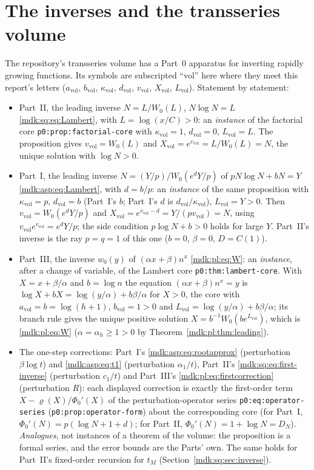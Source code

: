 \documentclass[11pt,letterpaper]{article}
\numberwithin{equation}{section}
\theoremstyle{remark}\newtheorem{remark}[theorem]{Remark}
\newcommand{\file}[1]{\nolinkurl{#1}}
\newcommand{\vol}{\mathrm{vol}}
\begin{document}
\section*{The inverses and the transseries volume}\label{mdk:sec:inverses}
The repository's transseries volume \cite{TSvol} has a Part~0 apparatus for inverting rapidly growing functions. Its symbols are subscripted ``vol'' here where they meet this report's letters ($a_\vol$, $b_\vol$, $\kappa_\vol$, $d_\vol$, $v_\vol$, $X_\vol$, $L_\vol$). Statement by statement:
\begin{itemize}
\item Part~II, the leading inverse $N=L/W_0(L)$, $N\log N=L$ \eqref{mdk:sq:eq:Lambert}, with $L=\log(x/C)>0$: an \emph{instance} of the factorial core \file{p0:prop:factorial-core} with $\kappa_\vol=1$, $d_\vol=0$, $L_\vol=L$. The proposition gives $v_\vol=W_0(L)$ and $X_\vol=e^{v_\vol}=L/W_0(L)=N$, the unique solution with $\log N>0$.
\item Part~I, the leading inverse $N=(Y/p)/W_0(e^dY/p)$ of $pN\log N+bN=Y$ \eqref{mdk:asp:eq:Lambert}, with $d=b/p$: an \emph{instance} of the same proposition with $\kappa_\vol=p$, $d_\vol=b$ (Part~I's $b$; Part~I's $d$ is $d_\vol/\kappa_\vol$), $L_\vol=Y>0$. Then $v_\vol=W_0(e^dY/p)$ and $X_\vol=e^{v_\vol-d}=Y/(pv_\vol)=N$, using $v_\vol e^{v_\vol}=e^dY/p$; the side condition $p\log N+b>0$ holds for large $Y$. Part~II's inverse is the ray $p=q=1$ of this one ($b=0$, $\beta=0$, $D=C(1)$).
\item Part~III, the inverse $w_0(y)$ of $(\alpha x+\beta)n^x$ \eqref{mdk:pl:eq:W}: an \emph{instance}, after a change of variable, of the Lambert core \file{p0:thm:lambert-core}. With $X=x+\beta/\alpha$ and $b=\log n$ the equation $(\alpha x+\beta)n^x=y$ is $\log X+bX=\log(y/\alpha)+b\beta/\alpha$ for $X>0$, the core with $a_\vol=b=\log(h+1)$, $b_\vol=1>0$ and $L_\vol=\log(y/\alpha)+b\beta/\alpha$; its branch rule gives the unique positive solution $X=b^{-1}W_0(be^{L_\vol})$, which is \eqref{mdk:pl:eq:W} ($\alpha=\alpha_h\ge1>0$ by Theorem~\ref{mdk:pl:thm:leading}).
\item The one-step corrections: Part~I's \eqref{mdk:asp:eq:rootapprox} (perturbation $\beta\log t$) and \eqref{mdk:asp:eq:t1} (perturbation $\alpha_1/t$), Part~II's \eqref{mdk:sq:eq:first-inverse} (perturbation $c_1/t$) and Part~III's \eqref{mdk:pl:eq:firstcorrection} (perturbation $R$): each displayed correction is exactly the first-order term $X-\varrho(X)/\Phi_0'(X)$ of the perturbation-operator series \file{p0:eq:operator-series} (\file{p0:prop:operator-form}) about the corresponding core (for Part~I, $\Phi_0'(N)=p(\log N+1+d)$; for Part~II, $\Phi_0'(N)=1+\log N=D_N$). \emph{Analogues}, not instances of a theorem of the volume: the proposition is a formal series, and the error bounds are the Parts' own. The same holds for Part~II's fixed-order recursion for $t_M$ (Section~\ref{mdk:sq:sec:inverse}).

\end{itemize}
\end{document}
